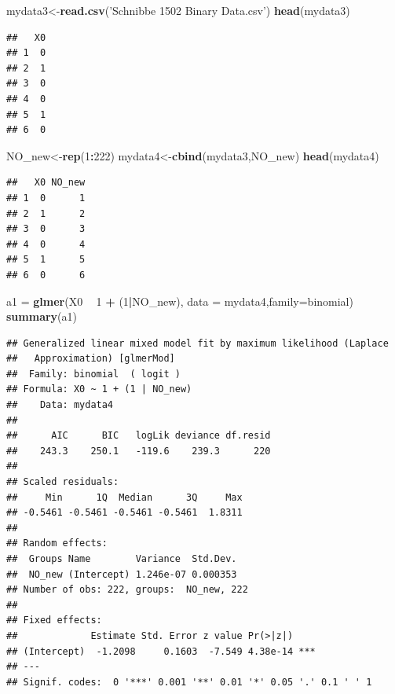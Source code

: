 \documentclass[]{book}
\newenvironment{Shaded}{\begin{snugshade}}{\end{snugshade}}
\newcommand{\KeywordTok}[1]{\textcolor[rgb]{0.13,0.29,0.53}{\textbf{#1}}}
\newcommand{\DataTypeTok}[1]{\textcolor[rgb]{0.13,0.29,0.53}{#1}}
\newcommand{\DecValTok}[1]{\textcolor[rgb]{0.00,0.00,0.81}{#1}}
\newcommand{\StringTok}[1]{\textcolor[rgb]{0.31,0.60,0.02}{#1}}
\newcommand{\OperatorTok}[1]{\textcolor[rgb]{0.81,0.36,0.00}{\textbf{#1}}}
\newcommand{\NormalTok}[1]{#1}
\begin{document}
\begin{Shaded}
\begin{Highlighting}[]
\NormalTok{mydata3<-}\KeywordTok{read.csv}\NormalTok{(}\StringTok{'Schnibbe 1502 Binary Data.csv'}\NormalTok{)}
\KeywordTok{head}\NormalTok{(mydata3)}
\end{Highlighting}
\end{Shaded}

\begin{verbatim}
##   X0
## 1  0
## 2  1
## 3  0
## 4  0
## 5  1
## 6  0
\end{verbatim}

\begin{Shaded}
\begin{Highlighting}[]
\NormalTok{NO_new<-}\KeywordTok{rep}\NormalTok{(}\DecValTok{1}\OperatorTok{:}\DecValTok{222}\NormalTok{)}
\NormalTok{mydata4<-}\KeywordTok{cbind}\NormalTok{(mydata3,NO_new)}
\KeywordTok{head}\NormalTok{(mydata4)}
\end{Highlighting}
\end{Shaded}

\begin{verbatim}
##   X0 NO_new
## 1  0      1
## 2  1      2
## 3  0      3
## 4  0      4
## 5  1      5
## 6  0      6
\end{verbatim}

\begin{Shaded}
\begin{Highlighting}[]
\NormalTok{a1 =}\StringTok{ }\KeywordTok{glmer}\NormalTok{(X0 }\OperatorTok{~}\StringTok{ }\DecValTok{1} \OperatorTok{+}\StringTok{ }\NormalTok{(}\DecValTok{1}\OperatorTok{|}\NormalTok{NO_new), }\DataTypeTok{data =}\NormalTok{ mydata4,}\DataTypeTok{family=}\NormalTok{binomial)}
\KeywordTok{summary}\NormalTok{(a1)}
\end{Highlighting}
\end{Shaded}

\begin{verbatim}
## Generalized linear mixed model fit by maximum likelihood (Laplace
##   Approximation) [glmerMod]
##  Family: binomial  ( logit )
## Formula: X0 ~ 1 + (1 | NO_new)
##    Data: mydata4
## 
##      AIC      BIC   logLik deviance df.resid 
##    243.3    250.1   -119.6    239.3      220 
## 
## Scaled residuals: 
##     Min      1Q  Median      3Q     Max 
## -0.5461 -0.5461 -0.5461 -0.5461  1.8311 
## 
## Random effects:
##  Groups Name        Variance  Std.Dev.
##  NO_new (Intercept) 1.246e-07 0.000353
## Number of obs: 222, groups:  NO_new, 222
## 
## Fixed effects:
##             Estimate Std. Error z value Pr(>|z|)    
## (Intercept)  -1.2098     0.1603  -7.549 4.38e-14 ***
## ---
## Signif. codes:  0 '***' 0.001 '**' 0.01 '*' 0.05 '.' 0.1 ' ' 1
\end{verbatim}
\end{document}
